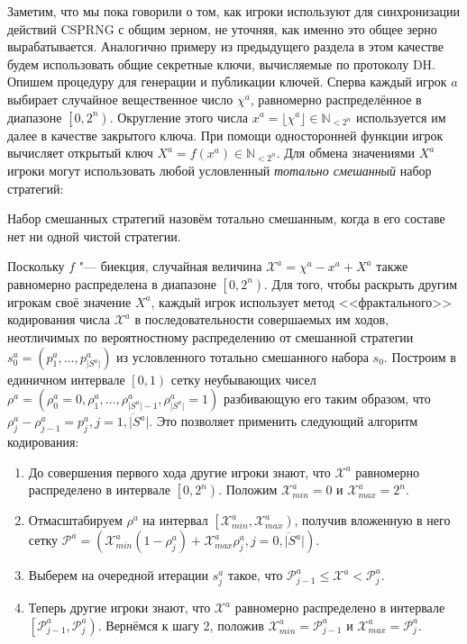 Заметим, что мы пока говорили о том, как игроки используют для синхронизации действий CSPRNG с общим зерном, не уточняя, как именно это общее зерно вырабатывается. Аналогично примеру из предыдущего раздела в этом качестве будем использовать общие секретные ключи, вычисляемые по протоколу DH. Опишем процедуру для генерации и публикации ключей. Сперва каждый игрок $a$ выбирает случайное вещественное число $\chi^a$, равномерно распределённое в диапазоне $\left[0, 2^n\right)$. Округление этого числа $x^a = \lfloor\chi^a\rfloor \in \mathbb{N}_{<2^n}$ используется им далее в качестве закрытого ключа. При помощи односторонней функции игрок вычисляет открытый ключ $X^a = f(x^a) \in \mathbb{N}_{<2^n}$. Для обмена значениями $X^a$ игроки могут использовать любой условленный \emph{тотально смешанный} набор стратегий:

\begin{definition}
	Набор смешанных стратегий назовём тотально смешанным, когда в его составе нет ни одной чистой стратегии.
\end{definition}

Поскольку $f$ "--- биекция, случайная величина $\mathcal{X}^a = \chi^a - x^a + X^a$ также равномерно распределена в диапазоне $\left[0, 2^n\right)$. Для того, чтобы раскрыть другим игрокам своё значение $X^a$, каждый игрок использует метод <<фрактального>> кодирования числа $\mathcal{X}^a$ в последовательности совершаемых им ходов, неотличимых по вероятностному распределению от смешанной стратегии $s_0^a = (p^a_1, \ldots, p^a_{\lvert S^a \rvert})$ из условленного тотально смешанного набора $s_0$. Построим в единичном интервале $\left[0, 1\right)$ сетку неубывающих чисел $\rho^a = (\rho^a_0 = 0, \rho^a_1, \ldots, \rho^a_{\lvert S^a \rvert - 1}, \rho^a_{\lvert S^a \rvert} = 1)$ разбивающую его таким образом, что $\rho^a_j - \rho^a_{j-1} = p^a_j, j = \overline{1,\lvert S^a \rvert}$. Это позволяет применить следующий алгоритм кодирования:

\begin{enumerate}
	\item До совершения первого хода другие игроки знают, что $\mathcal{X}^a$ равномерно распределено в интервале $\left[0, 2^n\right)$. Положим $\mathcal{X}^a_{min} = 0$ и $\mathcal{X}^a_{max} = 2^n$.
	\item Отмасштабируем $\rho^a$ на интервал $\left[\mathcal{X}^a_{min}, \mathcal{X}^a_{max}\right)$, получив вложенную в него сетку $\mathcal{P}^a = (\mathcal{X}^a_{min} (1 - \rho^a_j) + \mathcal{X}^a_{max} \rho^a_j, j = \overline{0, \lvert S^a \rvert})$.
	\item Выберем на очередной итерации $s^a_j$ такое, что $\mathcal{P}^a_{j-1} \le \mathcal{X}^a < \mathcal{P}^a_j$.
	\item Теперь другие игроки знают, что $\mathcal{X}^a$ равномерно распределено в интервале $\left[\mathcal{P}^a_{j-1}, \mathcal{P}^a_j\right)$. Вернёмся к шагу 2, положив $\mathcal{X}^a_{min} = \mathcal{P}^a_{j-1}$ и $\mathcal{X}^a_{max} = \mathcal{P}^a_j$.
\end{enumerate}

